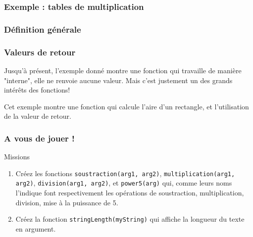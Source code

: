 \documentclass[handout]{beamer}
\begin{document}

\begin{frame}
\frametitle{Exemple : tables de multiplication}
\functionexemple
\end{frame}


\begin{frame}
\frametitle{Définition générale}
\end{frame}



\begin{frame}
\frametitle{Valeurs de retour}
Jusqu'à présent, l'exemple donné montre une fonction qui travaille de manière "interne", elle ne renvoie aucune valeur. Mais c'est justement un des grands intérêts des fonctions!


Cet exemple montre une fonction qui calcule l'aire d'un rectangle, et l'utilisation de la valeur de retour.
\end{frame}

\begin{frame}
\frametitle{A vous de jouer !}
\begin{block}{Missions}
    \begin{enumerate}
        \item
            Créez les fonctions \texttt{soustraction(arg1, arg2)}, \texttt{multiplication(arg1, arg2)}, \texttt{division(arg1, arg2)}, et \texttt{power5(arg)} qui, comme leurs noms l'indique font respectivement les opérations de soustraction, multiplication, division, mise à la puissance de 5.
        \item
            Créez la fonction \lstinline{stringLength(myString)} qui affiche la longueur du texte en argument.
    \end{enumerate}
    \end{block}
\end{frame}
\end{document}
